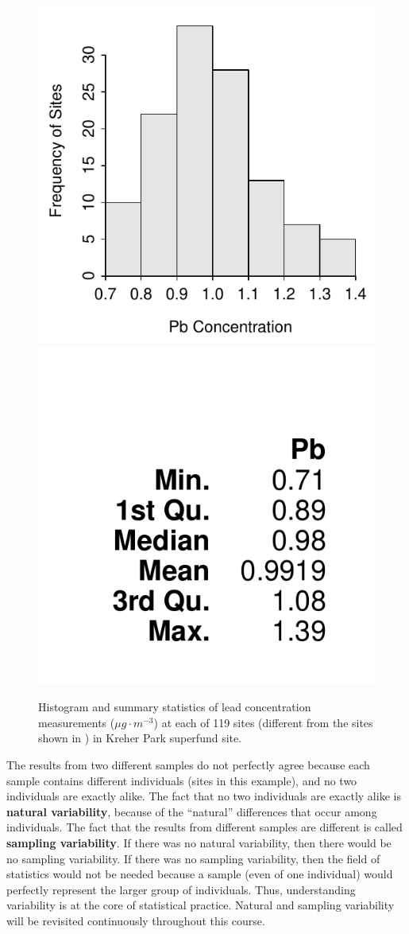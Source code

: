 \documentclass[10pt,openany]{book}\usepackage[]{graphicx}\usepackage[]{color}
\newenvironment{knitrout}{}{} %
\begin{document}
\begin{knitrout}
\color{fgcolor}\begin{figure}[hbtp]

{\centering \includegraphics[width=.4\linewidth]{Figs/KreherParkPbhist1-1} 
\includegraphics[width=.4\linewidth]{Figs/KreherParkPbhist1-2} 

}

\caption[Kreher Park 1]{Histogram and summary statistics of lead concentration measurements ($\mu g \cdot m^{-3}$) at each of 119 sites (different from the sites shown in ) in Kreher Park superfund site.}\label{fig:KreherParkPbhist1}
\end{figure}


\end{knitrout}

\vspace{18pt}
The results from two different samples do not perfectly agree because each sample contains different individuals (sites in this example), and no two individuals are exactly alike. The fact that no two individuals are exactly alike is \textbf{natural variability}, because of the ``natural'' differences that occur among individuals. The fact that the results from different samples are different is called \textbf{sampling variability}. If there was no natural variability, then there would be no sampling variability. If there was no sampling variability, then the field of statistics would not be needed because a sample (even of one individual) would perfectly represent the larger group of individuals. Thus, understanding variability is at the core of statistical practice. Natural and sampling variability will be revisited continuously throughout this course.
\end{document}
